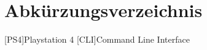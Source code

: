 \section*{Abkürzungsverzeichnis}
\begin{acronym}
    [PS4]{Playstation 4}
    [CLI]{Command Line Interface}
\end{acronym}
